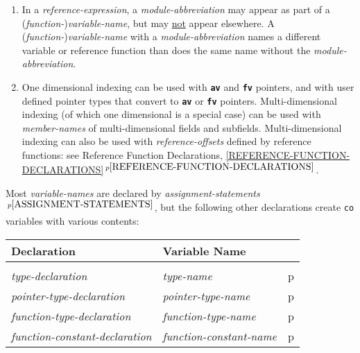 \documentclass[12pt]{article}
\newcommand{\TT}[1]{{\tt \bfseries #1}}
\newcommand{\itemref}[1]{\ref{#1}$\,^{p\pageref{#1}}$}
\newcommand{\pagref}[1]{p\pageref{#1}}
\newcommand{\pagnote}[1]{$\,^{p\pageref{#1}}$}
\newenvironment{indpar}[1][0.3in]%
	{\begin{list}{}%
		     {\setlength{\itemsep}{0in}%
		      \setlength{\topsep}{0in}%
		      \setlength{\parsep}{1ex}%
		      \setlength{\labelwidth}{#1}%
		      \setlength{\leftmargin}{#1}%
		      \addtolength{\leftmargin}{\labelsep}}%
	 \item}%
	{\end{list}}
\begin{document}
\begin{indpar}
\begin{enumerate}
Otherwise an {\em expression} with no operators is one of:
\begin{enumerate}
\item a {\em constant}\pagnote{CONSTANT}, or
\item
a (non-reference) {\em function-call}\pagnote{FUNCTION-CALL}, or
\item
an explicitly parenthesized subexpression
preceded by a {\em module-abbreviation}
(see \pagref{MA-SYNTACTIC-SUGAR} for more information about this last case)
\end{enumerate}
\item In a {\em reference-expression},
a {\em module-abbreviation} may appear as part of a
({\em function-}){\em variable-name}, but may \underline{not} appear
elsewhere.
A ({\em function-}){\em variable-name} with a {\em module-abbreviation}
names a different variable or reference function than does the same
name without the {\em module-abbreviation}.
\item
One dimensional indexing can be used with \TT{av} and \TT{fv} pointers,
and with user defined pointer types that convert to \TT{av} or \TT{fv}
pointers.
Multi-dimensional indexing (of which one dimensional is a special
case) can be used with {\em member-names}
of multi-dimensional fields and subfields.  Multi-dimensional indexing
can also be used with {\em reference-offsets} defined by
reference functions: see Reference Function Declarations,
\itemref{REFERENCE-FUNCTION-DECLARATIONS}.

\end{enumerate}
\end{indpar}

Most {\em variable-names} are declared by
{\em assignment-statements}\pagnote{ASSIGNMENT-STATEMENTS}, but
the following other declarations create {\tt co} variables
with various contents:
\begin{center}
\begin{tabular}{l@{~~~~}l@{~~~~}l}
\bf Declaration & \bf Variable Name &
\\\hline
\\[1ex]
{\em type-declaration} & {\em type-name} & \pagref{TYPE-DECLARATIONS} \\
{\em pointer-type-declaration} & {\em pointer-type-name}
                               & \pagref{POINTER-TYPE-DECLARATIONS} \\
{\em function-type-declaration} & {\em function-type-name}
                               & \pagref{FUNCTION-TYPE-DECLARATIONS} \\
{\em function-constant-declaration} & {\em function-constant-name}
                               & \pagref{FUNCTION-CONSTANT-DECLARATION} \\
\end{tabular}
\end{center}
\end{document}
